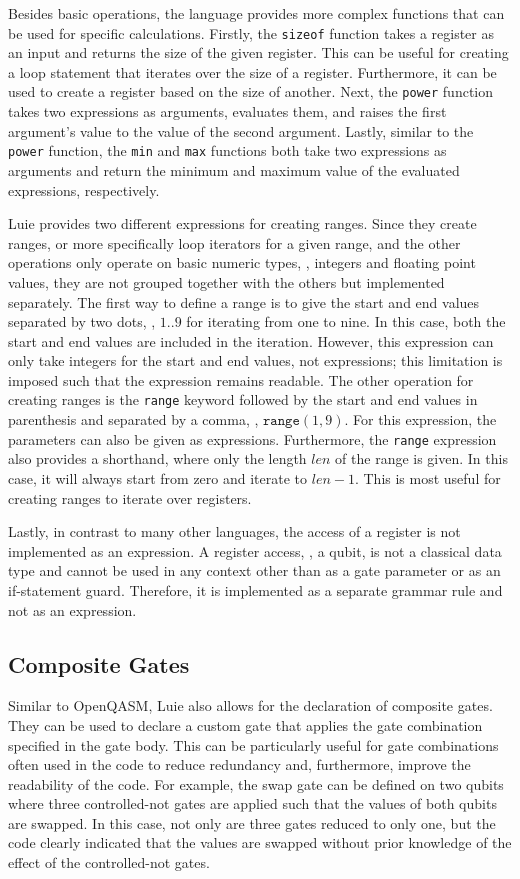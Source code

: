 Besides basic operations, the language provides more complex functions that can be used for specific calculations. Firstly, the \texttt{sizeof} function takes a register as an input and returns the size of the given register. This can be useful for creating a loop statement that iterates over the size of a register. Furthermore, it can be used to create a register based on the size of another. Next, the \texttt{power} function takes two expressions as arguments, evaluates them, and raises the first argument's value to the value of the second argument. Lastly, similar to the \texttt{power} function, the \texttt{min} and \texttt{max} functions both take two expressions as arguments and return the minimum and maximum value of the evaluated expressions, respectively.

Luie provides two different expressions for creating ranges. Since they create ranges, or more specifically loop iterators for a given range, and the other operations only operate on basic numeric types, \eg, integers and floating point values, they are not grouped together with the others but implemented separately. The first way to define a range is to give the start and end values separated by two dots, \eg, $1\texttt{..}9$ for iterating from one to nine. In this case, both the start and end values are included in the iteration. However, this expression can only take integers for the start and end values, not expressions; this limitation is imposed such that the expression remains readable. The other operation for creating ranges is the \texttt{range} keyword followed by the start and end values in parenthesis and separated by a comma, \eg, $\texttt{range}(1, 9)$. For this expression, the parameters can also be given as expressions. Furthermore, the \texttt{range} expression also provides a shorthand, where only the length $len$ of the range is given. In this case, it will always start from zero and iterate to $len - 1$. This is most useful for creating ranges to iterate over registers. 

Lastly, in contrast to many other languages, the access of a register is not implemented as an expression. A register access, \ie, a qubit, is not a classical data type and cannot be used in any context other than as a gate parameter or as an if-statement guard. Therefore, it is implemented as a separate grammar rule and not as an expression.

\subsection{Composite Gates}
\label{sec:concept_compositeGates}
Similar to OpenQASM, Luie also allows for the declaration of composite gates. They can be used to declare a custom gate that applies the gate combination specified in the gate body. This can be particularly useful for gate combinations often used in the code to reduce redundancy and, furthermore, improve the readability of the code. For example, the swap gate can be defined on two qubits where three controlled-not gates are applied such that the values of both qubits are swapped. In this case, not only are three gates reduced to only one, but the code clearly indicated that the values are swapped without prior knowledge of the effect of the controlled-not gates.

